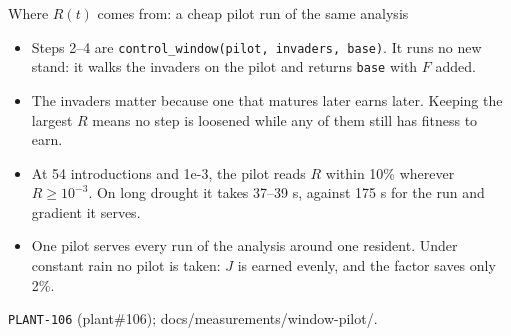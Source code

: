 \documentclass[aspectratio=169,10pt]{beamer}
\newcommand{\src}[1]{\par\vfill{\tiny\color{quiet} #1}}
\begin{document}
\begin{frame}{Where $R(t)$ comes from: a cheap pilot run of the same analysis}
  \begin{center}
  \end{center}
  \small
  \begin{itemize}
    \item Steps 2--4 are \texttt{control\_window(pilot, invaders, base)}. It runs no new
      stand: it walks the invaders on the pilot and returns \texttt{base} with $F$ added.
    \item The invaders matter because one that matures later earns later. Keeping the largest
      $R$ means no step is loosened while any of them still has fitness to earn.
    \item At 54 introductions and 1e-3, the pilot reads $R$ within 10\% wherever $R \ge 10^{-3}$.
      On long drought it takes 37--39 s, against 175 s for the run and gradient it serves.
    \item One pilot serves every run of the analysis around one resident. Under constant rain no
      pilot is taken: $J$ is earned evenly, and the factor saves only 2\%.
  \end{itemize}
  \src{\texttt{PLANT-106} (plant\#106); docs/measurements/window-pilot/.}
\end{frame}
\end{document}
